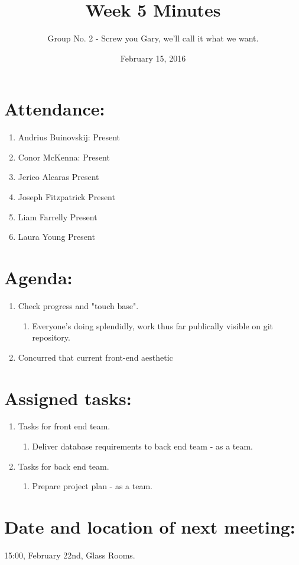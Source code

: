 \documentclass[a4paper, 12pt]{article}
\begin{document}
\title{Week 5 Minutes}
\author{Group No. 2 - Screw you Gary, we'll call it what we want.}
\date{February 15, 2016}
\maketitle

	\section{Attendance:}
		\begin{enumerate}[label*=\arabic*.]
			\item Andrius Buinovskij:	\dotfill Present
			\item Conor McKenna:		\dotfill Present
			\item Jerico Alcaras		\dotfill Present
			\item Joseph Fitzpatrick	\dotfill Present
			\item Liam Farrelly		\dotfill Present
			\item Laura Young		\dotfill Present
		\end{enumerate}

	\section{Agenda:}
		\begin{enumerate}[label*=\arabic*.]
			\item Check progress and "touch base".
			\begin{enumerate}[label*=\arabic*.]
				\item Everyone's doing splendidly, work thus far publically visible on git repository.
			\end{enumerate}
			\item Concurred that current front-end aesthetic 
		\end{enumerate}

	\newpage
	\section{Assigned tasks:}
		\begin{enumerate}[label*=\arabic*.]
			\item Tasks for front end team.
			\begin{enumerate}[label*=\arabic*.]
				\item Deliver database requirements to back end team - as a team.
			\end{enumerate}
			\item Tasks for back end team.
			\begin{enumerate}[label*=\arabic*.]
				\item Prepare project plan - as a team.
			\end{enumerate}
		\end{enumerate}

	\section{Date and location of next meeting:}
		15:00, February 22nd, Glass Rooms.
\end{document}
